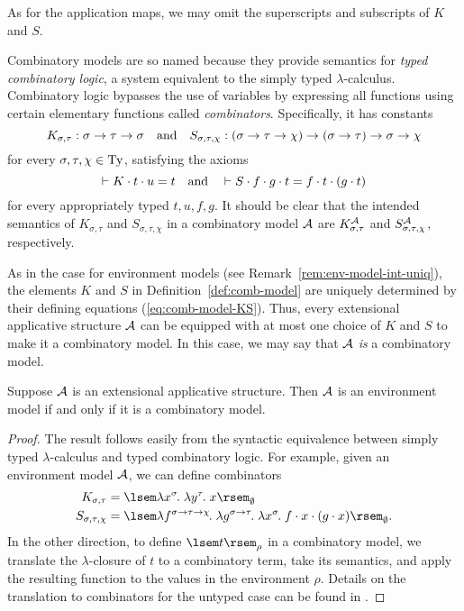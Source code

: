 As for the application maps, we may omit the superscripts and subscripts of $K$ and $S$.

\begin{rem}
Combinatory models are so named because they provide semantics for \textit{typed combinatory logic}, a system equivalent to the simply typed $\lambda$-calculus. Combinatory logic bypasses the use of variables by expressing all functions using certain elementary functions called \textit{combinators}. Specifically, it has constants
\[ K_{\sigma,\tau} : \sigma \to \tau \to \sigma \quad\text{and}\quad
    S_{\sigma,\tau,\chi} : (\sigma \to \tau \to \chi) \to (\sigma \to \tau) \to \sigma \to \chi \]
for every $\sigma, \tau, \chi \in \mathrm{Ty}$, satisfying the axioms
\[ \vdash K \cdot t \cdot u = t \quad\text{and}\quad
    \vdash S \cdot f \cdot g \cdot t = f \cdot t \cdot (g \cdot t) \]
for every appropriately typed $t, u, f, g$. It should be clear that the intended semantics of $K_{\sigma,\tau}$ and $S_{\sigma,\tau,\chi}$ in a combinatory model $\mathcal{A}$ are $K^{\mathcal{A}}_{\sigma,\tau}$ and $S^{\mathcal{A}}_{\sigma,\tau,\chi}$, respectively.
\end{rem}

\begin{rem} \label{rem:comb-model-KS-uniq}
As in the case for environment models (see Remark~\ref{rem:env-model-int-uniq}), the elements $K$ and $S$ in Definition~\ref{def:comb-model} are uniquely determined by their defining equations (\ref{eq:comb-model-KS}). Thus, every extensional applicative structure $\mathcal{A}$ can be equipped with at most one choice of $K$ and $S$ to make it a combinatory model. In this case, we may say that $\mathcal{A}$ \textit{is} a combinatory model.
\end{rem}

\begin{prop} \label{prop:env-comb-mod-equiv}
Suppose $\mathcal{A}$ is an extensional applicative structure. Then $\mathcal{A}$ is an environment model if and only if it is a combinatory model.
\begin{proof}
The result follows easily from the syntactic equivalence between simply typed $\lambda$-calculus and typed combinatory logic. For example, given an environment model $\mathcal{A}$, we can define combinators
\begin{align*}
K_{\sigma,\tau} &= \sint{\lamv{x}{\sigma}{\lamv{y}{\tau}{x}}}{\empenv} \\
S_{\sigma,\tau,\chi} &= \sint{\lamv{f}{\functy{\sigma}{\functy{\tau}{\chi}}}{\lamv{g}{\functy{\sigma}{\tau}}{\lamv{x}{\sigma}{\app{\app{f}{x}}{(\app{g}{x})}}}}}{\empenv}.
\end{align*}
In the other direction, to define $\sint{t}{\rho}$ in a combinatory model, we translate the $\lambda$-closure of $t$ to a combinatory term, take its semantics, and apply the resulting function to the values in the environment $\rho$. Details on the translation to combinators for the untyped case can be found in \cite{barendregt:1984, hindley-seldin:1986}.
\end{proof}
\end{prop}

